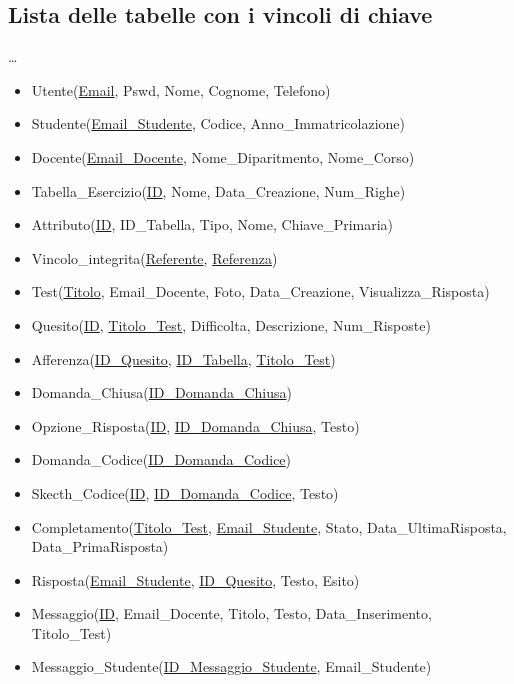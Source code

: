 \documentclass{article}
\begin{document}
\subsection{Lista delle tabelle con i vincoli di chiave}
\large
\dots 
\begin{itemize}[label={ }, leftmargin=*, wide=1pt]
    \itemsep0em
    \item Utente(\underline{Email}, Pswd, Nome, Cognome, Telefono)
    \item Studente(\underline{Email\_Studente}, Codice, Anno\_Immatricolazione)
    \item Docente(\underline{Email\_Docente}, Nome\_Diparitmento, Nome\_Corso)
    \item Tabella\_Esercizio(\underline{ID}, Nome, Data\_Creazione, Num\_Righe)
    \item Attributo(\underline{ID}, ID\_Tabella, Tipo, Nome, Chiave\_Primaria)
    \item Vincolo\_integrita(\underline{Referente}, \underline{Referenza})
    \item Test(\underline{Titolo}, Email\_Docente, Foto, Data\_Creazione, Visualizza\_Risposta)
    \item Quesito(\underline{ID}, \underline{Titolo\_Test}, Difficolta, Descrizione, Num\_Risposte)
    \item Afferenza(\underline{ID\_Quesito}, \underline{ID\_Tabella}, \underline{Titolo\_Test})
    \item Domanda\_Chiusa(\underline{ID\_Domanda\_Chiusa})
    \item Opzione\_Risposta(\underline{ID}, \underline{ID\_Domanda\_Chiusa}, Testo)
    \item Domanda\_Codice(\underline{ID\_Domanda\_Codice})
    \item Skecth\_Codice(\underline{ID}, \underline{ID\_Domanda\_Codice}, Testo)
    \item Completamento(\underline{Titolo\_Test}, \underline{Email\_Studente}, Stato, Data\_UltimaRisposta, Data\_PrimaRisposta)
    \item Risposta(\underline{Email\_Studente}, \underline{ID\_Quesito}, Testo, Esito)
    \item Messaggio(\underline{ID}, Email\_Docente, Titolo, Testo, Data\_Inserimento, Titolo\_Test)
    \item Messaggio\_Studente(\underline{ID\_Messaggio\_Studente}, Email\_Studente)
\end{itemize}
\end{document}

